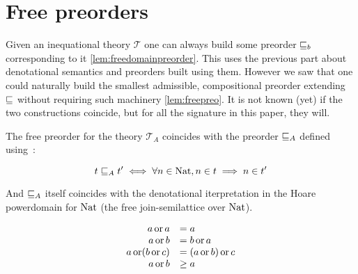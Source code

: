 
\section{Free preorders}

Given an inequational theory $\mathcal{T}$ one can always 
build some preorder $\sqsubseteq_b$ corresponding to it \ref{lem:freedomainpreorder}.
This uses the previous part about denotational semantics 
and preorders built using them. However we saw 
that one could naturally build the smallest admissible,
compositional preorder extending $\sqsubseteq$ without 
requiring such machinery \ref{lem:freepreo}. 
It is not known (yet) if the two constructions coincide,
but for all the signature in this paper, they will.

\begin{alemma}
    The free preorder for the theory 
    $\mathcal{T}_A$ coincides 
    with the preorder $\sqsubseteq_A$ defined 
    using~:

    \begin{equation*}
        t \sqsubseteq_A t' 
        \iff
        \forall n \in \textnormal{Nat}, n \in t \implies n \in t'
    \end{equation*}

    And $\sqsubseteq_A$ itself coincides with the denotational
    iterpretation in the Hoare powerdomain for $\textnormal{Nat}$
    (the free join-semilattice over $\textnormal{Nat}$).

    \begin{equation*}
        \begin{array}{rl}
            a \operatorname{or} a &= a \\
            a \operatorname{or} b &= b \operatorname{or} a \\
            a \operatorname{or} (b \operatorname{or} c) &= (a \operatorname{or} b) \operatorname{or} c \\
            a \operatorname{or} b &\geq a
        \end{array}
    \end{equation*}
\end{alemma}

